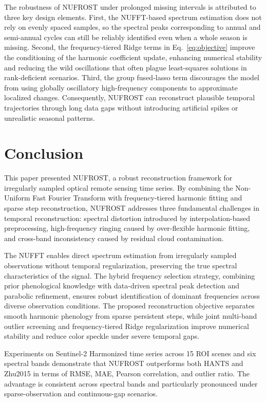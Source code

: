 \documentclass[letterpaper,journal]{IEEEtran}
\begin{document}
The robustness of NUFROST under prolonged missing intervals is attributed to three key design elements. First, the NUFFT-based spectrum estimation does not rely on evenly spaced samples, so the spectral peaks corresponding to annual and semi-annual cycles can still be reliably identified even when a whole season is missing. Second, the frequency-tiered Ridge terms in Eq.~\ref{eq:objective} improve the conditioning of the harmonic coefficient update, enhancing numerical stability and reducing the wild oscillations that often plague least-squares solutions in rank-deficient scenarios. Third, the group fused-lasso term discourages the model from using globally oscillatory high-frequency components to approximate localized changes. Consequently, NUFROST can reconstruct plausible temporal trajectories through long data gaps without introducing artificial spikes or unrealistic seasonal patterns.

\section{Conclusion}

This paper presented NUFROST, a robust reconstruction framework for irregularly sampled optical remote sensing time series. By combining the Non-Uniform Fast Fourier Transform with frequency-tiered harmonic fitting and sparse step reconstruction, NUFROST addresses three fundamental challenges in temporal reconstruction: spectral distortion introduced by interpolation-based preprocessing, high-frequency ringing caused by over-flexible harmonic fitting, and cross-band inconsistency caused by residual cloud contamination.

The NUFFT enables direct spectrum estimation from irregularly sampled observations without temporal regularization, preserving the true spectral characteristics of the signal. The hybrid frequency selection strategy, combining prior phenological knowledge with data-driven spectral peak detection and parabolic refinement, ensures robust identification of dominant frequencies across diverse observation conditions. The proposed reconstruction objective separates smooth harmonic phenology from sparse persistent steps, while joint multi-band outlier screening and frequency-tiered Ridge regularization improve numerical stability and reduce color speckle under severe temporal gaps.

Experiments on Sentinel-2 Harmonized time series across 15 ROI scenes and six spectral bands demonstrate that NUFROST outperforms both HANTS and Zhu2015 in terms of RMSE, MAE, Pearson correlation, and outlier ratio. The advantage is consistent across spectral bands and particularly pronounced under sparse-observation and continuous-gap scenarios.
\end{document}
